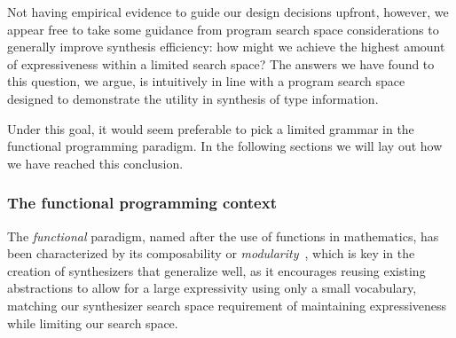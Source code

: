 \documentclass{article}
\begin{document}
Not having empirical evidence to guide our design decisions upfront, however,
we appear free to take some guidance from program search space considerations to generally improve synthesis efficiency:
how might we achieve the highest amount of expressiveness within a limited search space?
The answers we have found to this question, we argue,
is intuitively in line with a program search space designed to demonstrate the utility in synthesis of type information.

Under this goal, it would seem preferable to pick a limited grammar in the functional programming paradigm.
In the following sections we will lay out how we have reached this conclusion.

\subsubsection{The functional programming context}


The \emph{functional} paradigm, named after the use of functions in mathematics,
has been characterized by its composability or \emph{modularity}~\citep{hughes1989functional},
which is key in the creation of synthesizers that generalize well,
as it encourages reusing existing abstractions to allow for a large expressivity using only a small vocabulary,
matching our synthesizer search space requirement of maintaining expressiveness while limiting our search space.
\end{document}
